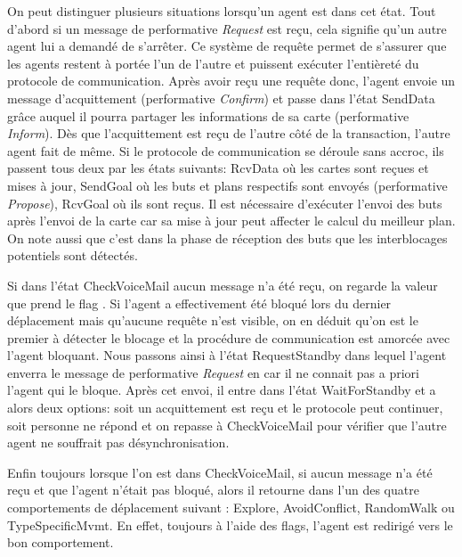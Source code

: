 \documentclass[11pt]{article}
\begin{document}
On peut distinguer plusieurs situations lorsqu'un agent est dans cet état. Tout d'abord si un message de performative \textit{Request} est reçu, cela signifie qu'un autre agent lui a demandé de s'arrêter. Ce système de requête permet de s'assurer que les agents restent à portée l'un de l'autre et puissent exécuter l'entièreté du protocole de communication. Après avoir reçu une requête donc, l'agent envoie un message d'acquittement (performative \textit{Confirm}) et passe dans l'état \textsf{SendData} grâce auquel il pourra partager les informations de sa carte (performative \textit{Inform}). Dès que l'acquittement est reçu de l'autre côté de la transaction, l'autre agent fait de même. Si le protocole de communication se déroule sans accroc, ils passent tous deux par les états suivants: \textsf{RcvData} où les cartes sont reçues et mises à jour, \textsf{SendGoal} où les buts et plans respectifs sont envoyés (performative \textit{Propose}), \textsf{RcvGoal} où ils sont reçus. Il est nécessaire d'exécuter l'envoi des buts après l'envoi de la carte car sa mise à jour peut affecter le calcul du meilleur plan. On note aussi que c'est dans la phase de réception des buts que les interblocages potentiels sont détectés.

Si dans l'état \textsf{CheckVoiceMail} aucun message n'a été reçu, on regarde la valeur que prend le flag . Si l'agent a effectivement été bloqué lors du dernier déplacement mais qu'aucune requête n'est visible, on en déduit qu'on est le premier à détecter le blocage et la procédure de communication est amorcée avec l'agent bloquant. Nous passons ainsi à l'état \textsf{RequestStandby} dans lequel l'agent enverra le message de performative \textit{Request} en  car il ne connait pas a priori l'agent qui le bloque. Après cet envoi, il entre dans l'état \textsf{WaitForStandby} et a alors deux options: soit un acquittement est reçu et le protocole peut continuer, soit personne ne répond et on repasse à \textsf{CheckVoiceMail} pour vérifier que l'autre agent ne souffrait pas désynchronisation.

Enfin toujours lorsque l'on est dans \textsf{CheckVoiceMail}, si aucun message n'a été reçu et que l'agent n'était pas bloqué, alors il retourne dans l'un  des quatre comportements de déplacement suivant : \textsf{Explore}, \textsf{AvoidConflict}, \textsf{RandomWalk} ou \textsf{TypeSpecificMvmt}. En effet, toujours à l'aide des flags, l'agent est redirigé vers le bon comportement. 
\end{document}
